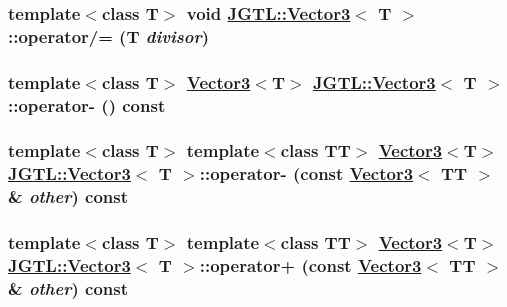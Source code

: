 \hypertarget{class_j_g_t_l_1_1_vector3_f72da40be6ade19181aefea13ca8a366}{
\subsubsection[operator/=]{\setlength{\rightskip}{0pt plus 5cm}template$<$class T$>$ void \hyperlink{class_j_g_t_l_1_1_vector3}{JGTL::Vector3}$<$ T $>$::operator/= (T {\em divisor})}}
\label{class_j_g_t_l_1_1_vector3_f72da40be6ade19181aefea13ca8a366}


\hypertarget{class_j_g_t_l_1_1_vector3_e6a4593cbdf91ff36fc8fdc4019abe0a}{
\subsubsection[operator-]{\setlength{\rightskip}{0pt plus 5cm}template$<$class T$>$ \hyperlink{class_j_g_t_l_1_1_vector3}{Vector3}$<$T$>$ \hyperlink{class_j_g_t_l_1_1_vector3}{JGTL::Vector3}$<$ T $>$::operator- () const}}
\label{class_j_g_t_l_1_1_vector3_e6a4593cbdf91ff36fc8fdc4019abe0a}


\hypertarget{class_j_g_t_l_1_1_vector3_e5139f97e72fed6c594e2e233cbfb974}{
\subsubsection[operator-]{\setlength{\rightskip}{0pt plus 5cm}template$<$class T$>$ template$<$class TT$>$ \hyperlink{class_j_g_t_l_1_1_vector3}{Vector3}$<$T$>$ \hyperlink{class_j_g_t_l_1_1_vector3}{JGTL::Vector3}$<$ T $>$::operator- (const \hyperlink{class_j_g_t_l_1_1_vector3}{Vector3}$<$ TT $>$ \& {\em other}) const}}
\label{class_j_g_t_l_1_1_vector3_e5139f97e72fed6c594e2e233cbfb974}


\hypertarget{class_j_g_t_l_1_1_vector3_5262b5c7212831d7a00b43c387d644f2}{
\subsubsection[operator+]{\setlength{\rightskip}{0pt plus 5cm}template$<$class T$>$ template$<$class TT$>$ \hyperlink{class_j_g_t_l_1_1_vector3}{Vector3}$<$T$>$ \hyperlink{class_j_g_t_l_1_1_vector3}{JGTL::Vector3}$<$ T $>$::operator+ (const \hyperlink{class_j_g_t_l_1_1_vector3}{Vector3}$<$ TT $>$ \& {\em other}) const}}
\label{class_j_g_t_l_1_1_vector3_5262b5c7212831d7a00b43c387d644f2}


